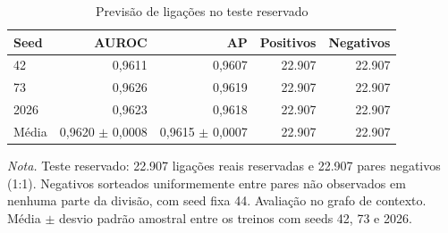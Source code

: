 \begin{table}[htbp]
\centering
\small
\caption{Previsão de ligações no teste reservado}
\label{tab:t2}
\begin{tabular}{lrrrr}
\toprule
\textbf{Seed} & \textbf{AUROC} & \textbf{AP} & \textbf{Positivos} & \textbf{Negativos} \\
\midrule
42 & 0,9611 & 0,9607 & 22.907 & 22.907 \\
73 & 0,9626 & 0,9619 & 22.907 & 22.907 \\
2026 & 0,9623 & 0,9618 & 22.907 & 22.907 \\
\midrule
Média & 0,9620 $\pm$ 0,0008 & 0,9615 $\pm$ 0,0007 & 22.907 & 22.907 \\
\bottomrule
\end{tabular}
\par\smallskip\parbox{\linewidth}{\scriptsize\textit{Nota.} Teste reservado: 22.907 ligações reais reservadas e 22.907 pares negativos (1:1). Negativos sorteados uniformemente entre pares não observados em nenhuma parte da divisão, com seed fixa 44. Avaliação no grafo de contexto. Média $\pm$ desvio padrão amostral entre os treinos com seeds 42, 73 e 2026.}
\end{table}
